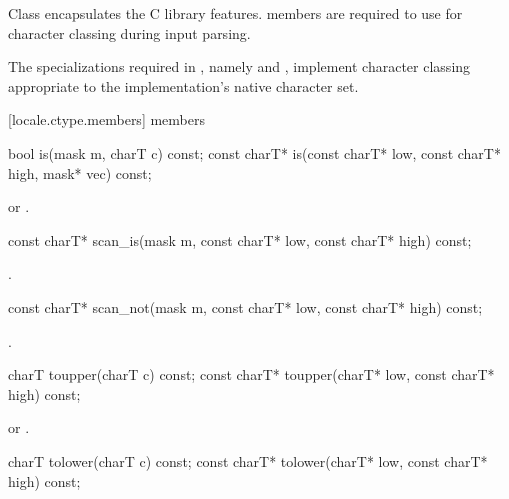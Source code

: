 \pnum
Class  encapsulates the C library  features.
 members are required to use 
for character classing during input parsing.

\pnum
The specializations
required in ,
namely  and ,
implement character classing appropriate
to the implementation's native character set.

[locale.ctype.members]{ members}

%
\begin{itemdecl}
bool         is(mask m, charT c) const;
const charT* is(const charT* low, const charT* high, mask* vec) const;
\end{itemdecl}

\begin{itemdescr}
\pnum
\returns
{} or .
\end{itemdescr}

%
\begin{itemdecl}
const charT* scan_is(mask m, const charT* low, const charT* high) const;
\end{itemdecl}

\begin{itemdescr}
\pnum
\returns
{}.
\end{itemdescr}

%
\begin{itemdecl}
const charT* scan_not(mask m, const charT* low, const charT* high) const;
\end{itemdecl}

\begin{itemdescr}
\pnum
\returns
{}.
\end{itemdescr}

%
\begin{itemdecl}
charT        toupper(charT c) const;
const charT* toupper(charT* low, const charT* high) const;
\end{itemdecl}

\begin{itemdescr}
\pnum
\returns
{} or .
\end{itemdescr}

%
\begin{itemdecl}
charT        tolower(charT c) const;
const charT* tolower(charT* low, const charT* high) const;
\end{itemdecl}

